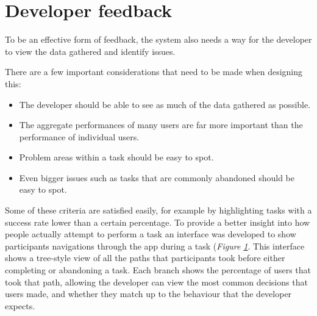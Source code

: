 \section{Developer feedback}

To be an effective form of feedback, the system also needs a way for the developer to view the data gathered and identify issues.

There are a few important considerations that need to be made when designing this:

\begin{itemize}
  \item The developer should be able to see as much of the data gathered as possible.
  \item The aggregate performances of many users are far more important than the performance of individual users.
  \item Problem areas within a task should be easy to spot.
  \item Even bigger issues such as tasks that are commonly abandoned should be easy to spot.
\end{itemize}

Some of these criteria are satisfied easily, for example by highlighting tasks with a success rate lower than a certain percentage. To provide a better insight into how people actually attempt to perform a task an interface was developed to show participants navigations through the app during a task (\emph{Figure \ref{fig:task-navigation}}. This interface shows a tree-style view of all the paths that participants took before either completing or abandoning a task. Each branch shows the percentage of users that took that path, allowing the developer can view the most common decisions that users made, and whether they match up to the behaviour that the developer expects.   

\begin{figure}
 \label{fig:task-navigation}
\end{figure}



